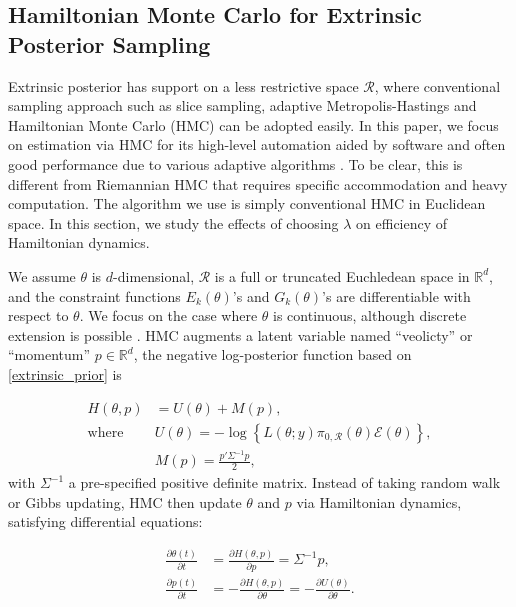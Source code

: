 \documentclass[10pt]{article}
\newcommand{\mc}[1]{\mathcal{#1}}
\DeclareMathOperator{\1}{\mathbbm{1}}
\begin{document}
\subsection{Hamiltonian Monte Carlo for Extrinsic Posterior Sampling}

Extrinsic posterior has support on a less restrictive space $\mc R$, where conventional sampling approach such as slice sampling, adaptive Metropolis-Hastings and Hamiltonian Monte Carlo (HMC) can be adopted easily. In this paper, we focus on estimation via HMC for its high-level automation aided by software and often good performance due to various adaptive algorithms \citep{hoffman2014no}. To be clear, this is different from Riemannian HMC that requires specific accommodation and heavy computation. The algorithm we use is simply conventional HMC in Euclidean space. In this section, we study the effects of choosing $\lambda$ on efficiency of Hamiltonian dynamics.

We assume $\theta$ is $d$-dimensional, $\mc R$ is a full or truncated Euchledean space in $\mathbb R^d$, and the constraint functions $E_k(\theta)$'s and $G_k(\theta)$'s  are differentiable with respect to $\theta$. We focus on the case where $\theta$ is continuous, although discrete extension is possible \citep{zhang2012continuous}. HMC augments a latent variable named ``veolicty'' or ``momentum'' $p\in \mathbb R^d$, the negative log-posterior function based on \eqref{extrinsic_prior} is

\begin{equation}
\begin{aligned}
H(\theta, p)& = U(\theta)+M(p),\\
\text{where } & U(\theta) = -\log\left\{ L(\theta;y)\pi_{0,\mc R}(\theta) \mc{E}(\theta) \right\},\\
& M(p) = \frac{p'\Sigma^{-1} p}{2},\end{aligned}
\end{equation}
with $\Sigma^{-1}$ a pre-specified positive definite matrix. Instead of taking random walk or Gibbs updating, HMC then update $\theta$ and $p$ via Hamiltonian dynamics, satisfying differential equations:

\begin{equation}
\begin{aligned}
\label{hamiltonian}
\frac{\partial \theta (t)}{\partial t} & =\frac{\partial H(\theta, p)}{\partial p} = \Sigma^{-1}p,\\
\frac{\partial p(t)}{\partial t}& =-\frac{\partial H(\theta, p)}{\partial \theta} = -\frac{\partial U(\theta)}{\partial \theta}.
\end{aligned}
\end{equation}
\end{document}
